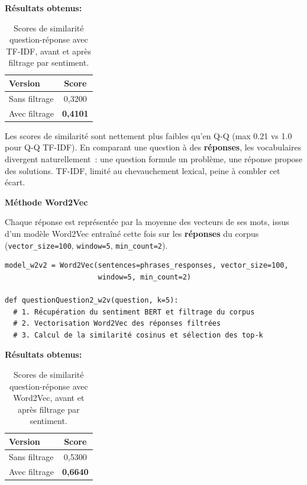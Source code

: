 \documentclass[12pt,a4paper]{report}
\begin{document}
\begin{center}
\textbf{Résultats obtenus:}
\end{center}
\begin{table}[H]
\begin{center}
\begin{tabular}{@{}lc@{}}
  \toprule
  Version & Score \\
  \midrule
  Sans filtrage & 0,3200 \\
  Avec filtrage  & \textbf{0,4101} \\
  \bottomrule
\end{tabular}
\end{center}
\caption{Scores de similarité question-réponse avec TF-IDF, avant et après filtrage par sentiment.}
\end{table}

\begin{note}[Interprétation]
Les scores de similarité sont nettement plus faibles qu'en Q-Q (max 0.21 vs 1.0 pour Q-Q TF-IDF).
En comparant une question à des \textbf{réponses}, les vocabulaires divergent naturellement~: une question formule un problème, une réponse propose des solutions. TF-IDF, limité au chevauchement lexical, peine à combler cet écart.
\end{note}

\vspace{0.5cm}

\textbf{Méthode Word2Vec}

Chaque réponse est représentée par la moyenne des vecteurs de ses mots, issus d'un modèle Word2Vec 
entraîné cette fois sur les \textbf{réponses} du corpus (\texttt{vector\_size=100}, \texttt{window=5},
 \texttt{min\_count=2}).

\begin{lstlisting}
model_w2v2 = Word2Vec(sentences=phrases_responses, vector_size=100,
                      window=5, min_count=2)

def questionQuestion2_w2v(question, k=5):
  # 1. Récupération du sentiment BERT et filtrage du corpus
  # 2. Vectorisation Word2Vec des réponses filtrées
  # 3. Calcul de la similarité cosinus et sélection des top-k
\end{lstlisting}

\pagebreak

\begin{center}
\textbf{Résultats obtenus:}
\end{center}
\begin{table}[H]
\begin{center}
\begin{tabular}{@{}lc@{}}
  \toprule
  Version & Score \\
  \midrule
  Sans filtrage & 0,5300 \\
  Avec filtrage  & \textbf{0,6640} \\
  \bottomrule
\end{tabular}
\end{center}
\caption{Scores de similarité question-réponse avec Word2Vec, avant et après filtrage par sentiment.}
\end{table}
\end{document}

